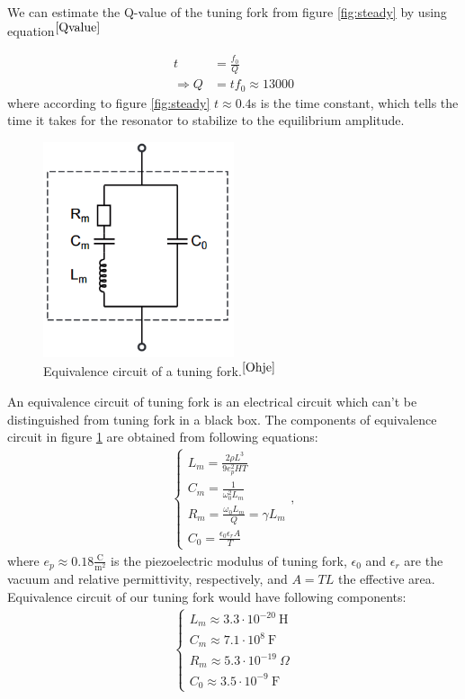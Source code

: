 \documentclass[12pt]{article}
\begin{document}
We can estimate the Q-value of the tuning fork from figure \ref{fig:steady} by using equation$^{\cite{Qvalue}}$

\begin{align*}
t &= \frac{f_0}{Q}\\
\Rightarrow Q &= tf_0 \approx 13000
\end{align*}
where according to figure \ref{fig:steady} $t \approx 0.4$s is the time constant, which tells the time it takes for the resonator to stabilize to the equilibrium amplitude.

\begin{figure}[!ht]
\centering
\includegraphics[width = 0.5\textwidth]{equivalence_circuit}
\caption{Equivalence circuit of a tuning fork.$^{\cite{Ohje}}$} \label{fig:equivalence_circuit}
\end{figure}

An equivalence circuit of tuning fork is an electrical circuit which can't be distinguished from tuning fork in a black box. The components of equivalence circuit in figure \ref{fig:equivalence_circuit} are obtained from following equations:
\begin{align} \label{eqn:equivalent}
\begin{cases}
L_m = \frac{2\rho L^3}{9e_p^2HT}\\
C_m = \frac{1}{\omega_0^2L_m}\\
R_m = \frac{\omega_0 L_m}{Q}=\gamma L_m\\
C_0 = \frac{\epsilon_0\epsilon_rA}{T}
\end{cases},
\end{align}
where $e_p \approx 0.18 \frac{\mathrm{C}}{\mathrm{m}^2}$ is the piezoelectric modulus of tuning fork, $\epsilon_0$ and $\epsilon_r$ are the vacuum and relative permittivity, respectively, and $A = TL$ the effective area. Equivalence circuit of our tuning fork would have following components:
\begin{align*}
\begin{cases}
L_m \approx 3.3\cdot10^{-20}~\mathrm{H}\\
C_m \approx 7.1\cdot10^8~\mathrm{F}\\
R_m \approx 5.3\cdot10^{-19}~\Omega\\
C_0 \approx 3.5\cdot10^{-9}~\mathrm{F}
\end{cases}
\end{align*}
\end{document}
